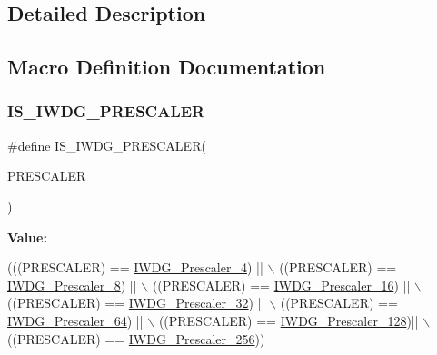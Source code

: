 \subsection{Detailed Description}


\subsection{Macro Definition Documentation}
\mbox{\label{group___i_w_d_g__prescaler_gab1e0695c1a22840d5be7c7fad283f4ba}} 
\subsubsection{\texorpdfstring{I\+S\+\_\+\+I\+W\+D\+G\+\_\+\+P\+R\+E\+S\+C\+A\+L\+ER}{IS\_IWDG\_PRESCALER}}
{\footnotesize\ttfamily \#define I\+S\+\_\+\+I\+W\+D\+G\+\_\+\+P\+R\+E\+S\+C\+A\+L\+ER(\begin{DoxyParamCaption}\item[{}]{P\+R\+E\+S\+C\+A\+L\+ER }\end{DoxyParamCaption})}

{\bfseries Value\+:}
\begin{DoxyCode}
(((PRESCALER) == \hyperlink{group___i_w_d_g__prescaler_ga82a058c196d5a9cd7ea2f2202b394ba0}{IWDG\_Prescaler\_4})  || \(\backslash\)
                                      ((PRESCALER) == \hyperlink{group___i_w_d_g__prescaler_ga59763b9a127c67adf5d11474188996a1}{IWDG\_Prescaler\_8})  || \(\backslash\)
                                      ((PRESCALER) == \hyperlink{group___i_w_d_g__prescaler_gafa81d30511ff5ec74bb38ed71f5bb66e}{IWDG\_Prescaler\_16}) || \(\backslash\)
                                      ((PRESCALER) == \hyperlink{group___i_w_d_g__prescaler_gaa8b091b6e4102513b1e3a1c4eb6756ba}{IWDG\_Prescaler\_32}) || \(\backslash\)
                                      ((PRESCALER) == \hyperlink{group___i_w_d_g__prescaler_ga7ea813c73ae0acb40acb60e7d3956910}{IWDG\_Prescaler\_64}) || \(\backslash\)
                                      ((PRESCALER) == \hyperlink{group___i_w_d_g__prescaler_gaea6bf96c2fd5a6f3b9574e7898096641}{IWDG\_Prescaler\_128})|| \(\backslash\)
                                      ((PRESCALER) == \hyperlink{group___i_w_d_g__prescaler_ga7d6e918748185639049644c970db2b43}{IWDG\_Prescaler\_256}))
\end{DoxyCode}


